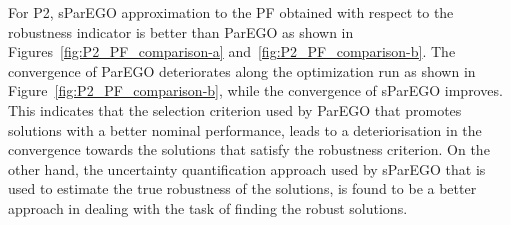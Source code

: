 \documentclass{llncs}
\begin{document}
For P2, sParEGO approximation to the PF obtained with respect to the robustness indicator is better than ParEGO as shown in Figures~\ref{fig:P2_PF_comparison-a} and~\ref{fig:P2_PF_comparison-b}. The convergence of ParEGO deteriorates along the optimization run as shown in Figure~\ref{fig:P2_PF_comparison-b}, while the convergence of sParEGO improves. This indicates that the selection criterion used by ParEGO that promotes solutions with a better nominal performance, leads to a deteriorisation in the convergence towards the solutions that satisfy the robustness criterion. On the other hand, the uncertainty quantification approach used by sParEGO that is used to estimate the true robustness of the solutions, is found to be a better approach in dealing with the task of finding the robust solutions.

\begin{figure}
\centering
{}
\hspace{1cm}
\\
\end{figure}
\end{document}
